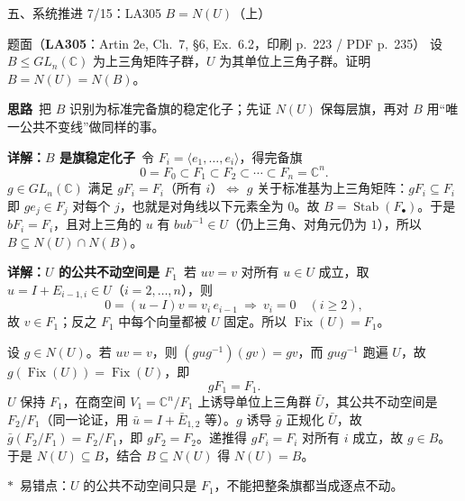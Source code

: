 \documentclass[aspectratio=169,10pt,fontset=none]{ctexbeamer}
\newcommand{\ex}[1]{\textcolor{accent}{\footnotesize\bfseries #1}}
\newcommand{\key}[1]{\textcolor{ink}{\bfseries #1}}
\newcommand{\starpt}{\textcolor{accent}{\bfseries$\ast$}}
\begin{document}
\begin{frame}[t]{五、系统推进 7/15：LA305 $B=N(U)$（上）}
\label{ex:LA305}
\scriptsize
\begin{block}{\footnotesize 题面（\ex{LA305}：Artin 2e, Ch.~7, \S6, Ex.~6.2，印刷 p.~223 / PDF p.~235）}
设 $B\le GL_n(\mathbb C)$ 为上三角矩阵子群，$U$ 为其单位上三角子群。证明 $B=N(U)=N(B)$。
\end{block}
\vspace{-0.6mm}
\key{思路}\ 把 $B$ 识别为标准完备旗的稳定化子；先证 $N(U)$ 保每层旗，再对 $B$ 用“唯一公共不变线”做同样的事。

\key{详解：$B$ 是旗稳定化子}\ 令 $F_i=\langle e_1,\dots,e_i\rangle$，得完备旗
\[
0=F_0\subset F_1\subset F_2\subset\cdots\subset F_n=\mathbb C^n.
\]
$g\in GL_n(\mathbb C)$ 满足 $gF_i=F_i$（所有 $i$）$\iff$ $g$ 关于标准基为上三角矩阵：$gF_i\subseteq F_i$ 即 $ge_j\in F_j$ 对每个 $j$，也就是对角线以下元素全为 $0$。故 $B=\operatorname{Stab}(F_\bullet)$。于是 $bF_i=F_i$，且对上三角的 $u$ 有 $bub^{-1}\in U$（仍上三角、对角元仍为 $1$），所以 $B\subseteq N(U)\cap N(B)$。

\key{详解：$U$ 的公共不动空间是 $F_1$}\ 若 $uv=v$ 对所有 $u\in U$ 成立，取 $u=I+E_{i-1,i}\in U$（$i=2,\dots,n$），则
\[
0=(u-I)v=v_i\,e_{i-1}\ \Longrightarrow\ v_i=0\quad(i\ge2),
\]
故 $v\in F_1$；反之 $F_1$ 中每个向量都被 $U$ 固定。所以 $\operatorname{Fix}(U)=F_1$。

设 $g\in N(U)$。若 $uv=v$，则 $(gug^{-1})(gv)=gv$，而 $gug^{-1}$ 跑遍 $U$，故 $g(\operatorname{Fix}(U))=\operatorname{Fix}(U)$，即
\[
gF_1=F_1.
\]
$U$ 保持 $F_1$，在商空间 $V_1=\mathbb C^n/F_1$ 上诱导单位上三角群 $\bar U$，其公共不动空间是 $F_2/F_1$（同一论证，用 $\bar u=I+\bar E_{1,2}$ 等）。$g$ 诱导 $\bar g$ 正规化 $\bar U$，故 $\bar g(F_2/F_1)=F_2/F_1$，即 $gF_2=F_2$。递推得 $gF_i=F_i$ 对所有 $i$ 成立，故 $g\in B$。于是 $N(U)\subseteq B$，结合 $B\subseteq N(U)$ 得 $N(U)=B$。

\starpt\ 易错点：$U$ 的公共不动空间只是 $F_1$，不能把整条旗都当成逐点不动。
\end{frame}
\end{document}
